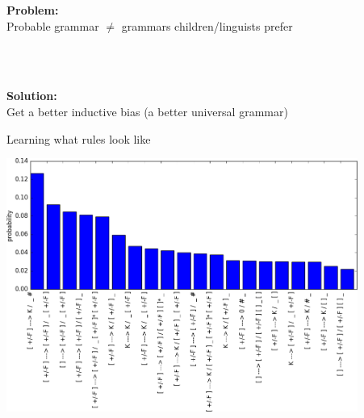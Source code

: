 \documentclass{beamer}
\begin{document}
\begin{frame}{}
  \large


  \textbf{Problem:} \\Probable grammar $\not=$ grammars children/linguists prefer

  \pause

  \\\\\vspace{1cm}

  \textbf{Solution:}\\ Get a better inductive bias (a better universal grammar)

  \end{frame}




\begin{frame}{Learning what rules look like}

\centering  \includegraphics[width = 11.5cm]{skeletonFrequencies.png}

\end{frame}
\end{document}
